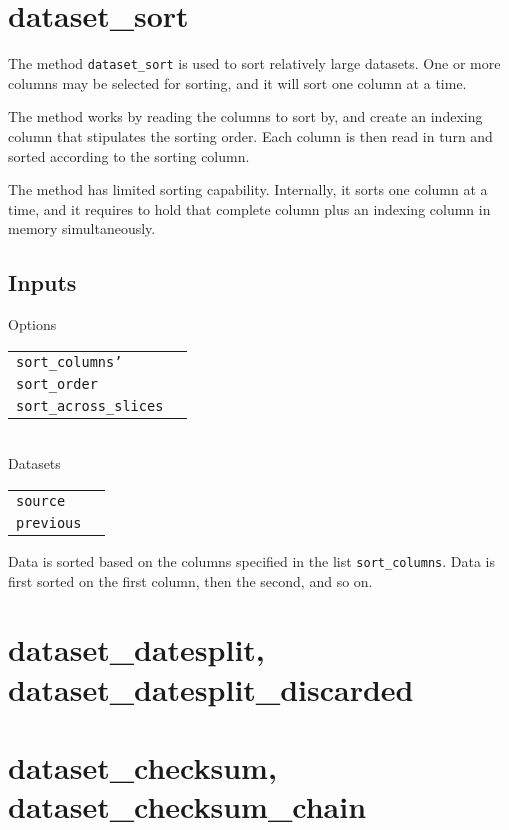 \clearpage
\section{dataset\_sort}
The method \texttt{dataset\_sort} is used to sort relatively large
datasets.  One or more columns may be selected for sorting, and it
will sort one column at a time.

The method works by reading the columns to sort by, and create an
indexing column that stipulates the sorting order.  Each column is
then read in turn and sorted according to the sorting column.

The method has limited sorting capability.  Internally, it sorts one
column at a time, and it requires to hold that complete column plus an
indexing column in memory simultaneously.

\subsection{Inputs}

\noindent Options\\

\begin{tabular}{ll}
  \texttt{sort\_columns'} & \\    %
  \texttt{sort\_order} & \\        %
  \texttt{sort\_across\_slices} & \\%
\end{tabular}\\

\noindent Datasets\\

\begin{tabular}{ll}
  \texttt{source} & \\
  \texttt{previous} & \\
\end{tabular}

Data is sorted based on the columns specified in the list
\texttt{sort\_columns}.  Data is first sorted on the first column,
then the second, and so on.





\clearpage
\section{dataset\_datesplit, dataset\_datesplit\_discarded}

\clearpage
\section{dataset\_checksum, dataset\_checksum\_chain}


